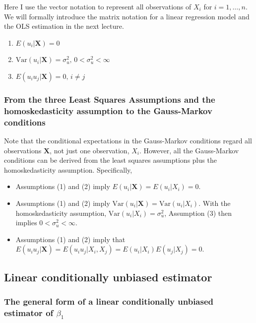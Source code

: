 \documentclass[a4paper,11pt]{article}
\newcommand{\var}{\mathrm{Var}}
\begin{document}
Here I use the vector
notation to represent all observations of \(X_i\) for \(i=1, \ldots,
n\). We will formally introduce the matrix notation for a linear
regression model and the OLS estimation in the next lecture.

\begin{enumerate}
\item \(E(u_i| \mathbf{X}) = 0\)
\item \(\var(u_i | \mathbf{X}) = \sigma^2_u,\, 0 < \sigma^2_u < \infty\)
\item \(E(u_i u_j | \mathbf{X}) = 0,\, i \neq j\)
\end{enumerate}

\subsubsection*{From the three Least Squares Assumptions and the homoskedasticity assumption to the Gauss-Markov conditions}
\label{sec:org8fe8a91}

Note that the conditional expectations in the Gauss-Markov conditions
regard all observations \(\mathbf{X}\), not just one observation,
\(X_i\). However, all the Gauss-Markov conditions can be derived from
the least squares assumptions plus the homoskedasticity
assumption. Specifically,

\begin{itemize}
\item Assumptions (1) and (2) imply \(E(u_i | \mathbf{X}) = E(u_i | X_i) =
  0\).
\item Assumptions (1) and (2) imply \(\var(u_i| \mathbf{X}) =
  \var(u_i | X_i)\). With the homoskedasticity assumption, \(\var(u_i |
  X_i) = \sigma^2_u\), Assumption (3) then implies \(0 < \sigma^2_u < \infty\).
\item Assumptions (1) and (2) imply that \(E(u_i u_j | \mathbf{X}) = E(u_i
  u_j | X_i, X_j) = E(u_i|X_i) E(u_j|X_j) = 0\).
\end{itemize}


\subsection{Linear conditionally unbiased estimator}
\label{sec:org269296f}

\subsubsection*{The general form of a linear conditionally unbiased estimator of \(\beta_1\)}
\label{sec:org3259e2f}
\end{document}
